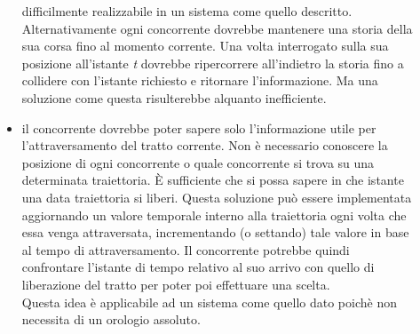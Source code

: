 \begin{description}
\begin{itemize}
difficilmente realizzabile in un sistema come
quello descritto.\\
Alternativamente ogni concorrente dovrebbe mantenere una storia della sua corsa
fino al momento corrente. Una volta interrogato
sulla sua posizione all'istante \emph{t} dovrebbe ripercorrere all'indietro la
storia fino a collidere con l'istante richiesto
e ritornare l'informazione. Ma una soluzione come questa risulterebbe alquanto
inefficiente.
\item il concorrente dovrebbe poter sapere solo l'informazione utile per
l'attraversamento del tratto corrente. Non è necessario
conoscere la posizione di ogni concorrente o quale concorrente si trova su una
determinata traiettoria. \`{E} sufficiente che
si possa sapere in che istante una data traiettoria si liberi. Questa soluzione
può essere implementata aggiornando un valore
temporale interno alla traiettoria ogni volta che essa venga attraversata,
incrementando (o settando) tale valore in base al 
tempo di attraversamento. Il concorrente potrebbe quindi confrontare l'istante
di tempo relativo
al suo arrivo con quello di liberazione del tratto per poter poi effettuare una
scelta.\\
Questa idea è applicabile ad un sistema come quello dato poichè non necessita di
un orologio assoluto.
\end{itemize}
\end{description}

